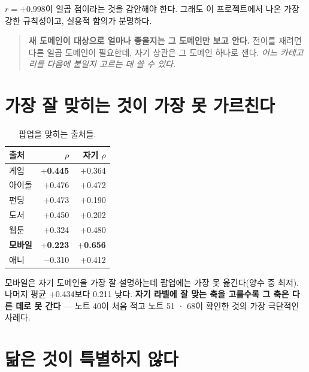 \documentclass[10pt]{article}
\begin{document}

$r=+0.998$이 일곱 점이라는 것을 감안해야 한다. 그래도 이 프로젝트에서 나온
가장 강한 규칙성이고, 실용적 함의가 분명하다.

\begin{quote}\fontsize{9.5}{11.5}\selectfont
\textbf{새 도메인이 대상으로 얼마나 좋을지는 그 도메인만 보고 안다.} 전이를
재려면 다른 일곱 도메인이 필요한데, 자기 상관은 그 도메인 하나로 잰다.
\emph{어느 카테고리를 다음에 붙일지 고르는 데 쓸 수 있다.}
\end{quote}

\section{가장 잘 맞히는 것이 가장 못 가르친다}

\begin{table}[t]
\centering\tsize
\caption{팝업을 맞히는 출처들.}
\begin{tabular}{lrr}
\toprule
출처 & $\rho$ & 자기 $\rho$ \\
\midrule
게임 & \textbf{$+$0.445} & $+$0.364 \\
아이돌 & $+$0.476 & $+$0.472 \\
펀딩 & $+$0.473 & $+$0.190 \\
도서 & $+$0.450 & $+$0.202 \\
웹툰 & $+$0.324 & $+$0.480 \\
\textbf{모바일} & \textbf{$+$0.223} & \textbf{$+$0.656} \\
애니 & $-$0.310 & $+$0.412 \\
\bottomrule
\end{tabular}
\end{table}

모바일은 자기 도메인을 가장 잘 설명하는데 팝업에는 가장 못 옮긴다(양수 중
최저). 나머지 평균 $+$0.434보다 0.211 낮다. \textbf{자기 라벨에 잘 맞는 축을
고를수록 그 축은 다른 데로 못 간다} --- 노트 40이 처음 적고 노트 51 · 68이
확인한 것의 가장 극단적인 사례다.

\section{닮은 것이 특별하지 않다}
\end{document}
